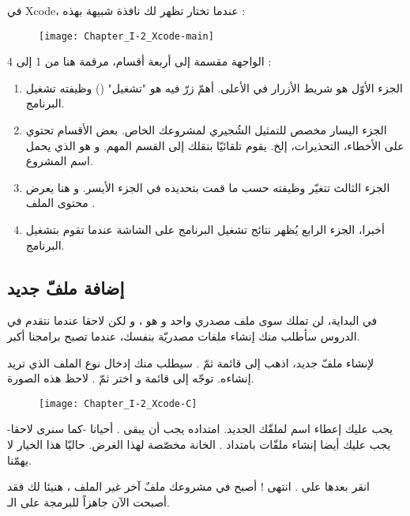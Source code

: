 في
\textenglish{Xcode}،
عندما تختار
تظهر لك نافذة شبيهة بهذه :

\begin{figure}[H]
	\centering
	\texttt{[image: Chapter\_I-2\_Xcode-main]}
\end{figure}

الواجهة مقسمة إلى أربعة أقسام، مرقمة هنا من 1 إلى 4 :

\begin{enumerate}
  \item الجزء الأوّل هو شريط الأزرار في الأعلى. أهمّ زرّ فيه هو
"تشغيل"
()
وظيفته تشغيل البرنامج.
  \item الجزء اليسار مخصص للتمثيل الشُجيري لمشروعك الخاص. بعض الأقسام تحتوي على الأخطاء، التحذيرات، إلخ. يقوم
تلقائيّا بنقلك إلى القسم المهم. و هو الذي يحمل اسم المشروع.
  \item الجزء الثالث تتغيّر وظيفته حسب ما قمت بتحديده في الجزء الأيسر. و هنا يعرض محتوى الملف
.
  \item أخيرا، الجزء الرابع يُظهر نتائج تشغيل البرنامج على الشاشة عندما تقوم بتشغيل البرنامج.
\end{enumerate}

\subsection{إضافة ملفّ جديد}

في البداية، لن تملك سوى ملف مصدري واحد و هو
،
و لكن لاحقا عندما نتقدم في الدروس سأطلب منك إنشاء ملفات مصدريّة بنفسك، عندما تصبح برامجنا أكبر.

لإنشاء ملفّ جديد، اذهب إلى قائمة
ثمّ
.
سيطلب منك إدخال نوع الملف الذي تريد إنشاءه. توجّه إلى قائمة
و اختر
ثمّ
.
لاحظ هذه الصورة.

\begin{figure}[H]
	\centering
	\texttt{[image: Chapter\_I-2\_Xcode-C]}
\end{figure}

يجب عليك إعطاء اسم لملفّك الجديد. امتداده يجب أن يبقى
.
أحيانا -كما سنرى لاحقا- يجب عليك أيضا إنشاء ملفّات بامتداد
.
الخانة
مخصّصة لهذا الغرض. حاليّا هذا الخيار لا يهمّنا.

انقر بعدها على
.
انتهى ! أصبح في مشروعك ملفٌ آخر غير الملف
،
هنيئا لك فقد أصبحت الآن جاهزاً للبرمجة على الـ.

